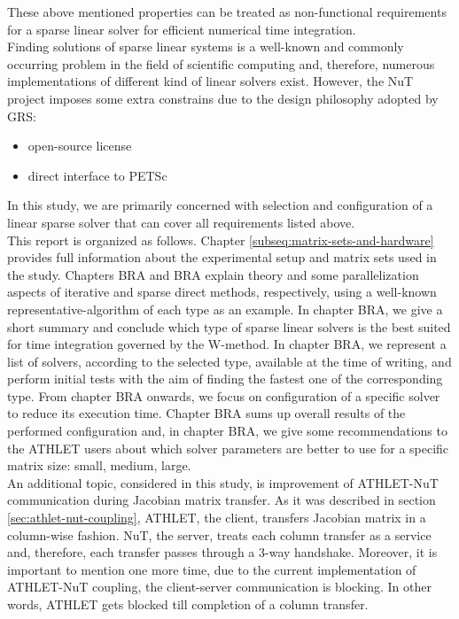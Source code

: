 These above mentioned properties can be treated as non-functional requirements for a sparse linear solver for efficient numerical time integration.\\

 
Finding solutions of sparse linear systems is a well-known and commonly occurring problem in the field of scientific computing and, therefore, numerous implementations of different kind of linear solvers exist. However, the NuT project imposes some extra constrains due to the design philosophy adopted by GRS: \\


\begin{itemize}
	\item open-source license
	\item direct interface to PETSc
\end{itemize}



In this study, we are primarily concerned with selection and configuration of a linear sparse solver that can cover all requirements listed above.\\


This report is organized as follows. Chapter \ref{subseq:matrix-sets-and-hardware} provides full information about the experimental setup and matrix sets used in the study. Chapters BRA and BRA explain theory and some parallelization aspects of iterative and sparse direct methods, respectively, using a  well-known representative-algorithm of each type as an example. In chapter BRA, we give a short summary and conclude which type of sparse linear solvers is the best suited for time integration governed by the W-method. In chapter BRA, we represent a list of solvers, according to the selected type, available at the time of writing, and perform initial tests with the aim of finding the fastest one of the corresponding type. From chapter BRA onwards, we focus on configuration of a specific solver to reduce its execution time. Chapter BRA sums up overall results of the performed configuration and, in chapter BRA, we give some recommendations to the ATHLET users about which solver parameters are better to use for a specific matrix size: small, medium, large.\\


An additional topic, considered in this study, is improvement of ATHLET-NuT communication during Jacobian matrix transfer. As it was described in section \ref{sec:athlet-nut-coupling}, ATHLET, the client, transfers Jacobian matrix in a column-wise fashion. NuT, the server, treats each column transfer as a service and, therefore, each transfer passes through a 3-way handshake. Moreover, it is important to mention one more time,   due to the current implementation of ATHLET-NuT coupling, the client-server communication is blocking. In other words, ATHLET gets blocked till completion of a column transfer. \\


